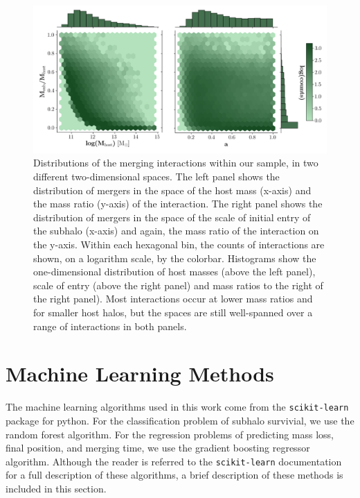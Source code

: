 \documentclass[fleqn,usenatbib]{mnras}
\begin{document}
\begin{figure}[h]
	\includegraphics[width=\textwidth]{Figures/combined_distributions_logbin}
    \caption{Distributions of the merging interactions within our sample, in two different two-dimensional spaces. The left panel shows the distribution of mergers in the space of the host mass (x-axis) and the mass ratio (y-axis) of the interaction. The right panel shows the distribution of mergers in the space of the scale of initial entry of the subhalo (x-axis) and again, the mass ratio of the interaction on the y-axis. Within each hexagonal bin, the counts of interactions are shown, on a logarithm scale, by the colorbar. Histograms show the one-dimensional distribution of host masses (above the left panel), scale of entry (above the right panel) and mass ratios to the right of the right panel). Most interactions occur at lower mass ratios and for smaller host halos, but the spaces are still well-spanned over a range of interactions in both panels. }
    \label{fig:combined_distributions_logBin}
\end{figure}



\section{Machine Learning Methods}
The machine learning algorithms used in this work come from the \texttt{scikit-learn} package for python. For the classification problem of subhalo survivial, we use the random forest algorithm. For the regression problems of predicting mass loss, final position, and merging time, we use the gradient boosting regressor algorithm. Although the reader is referred to the \texttt{scikit-learn} documentation for a full description of these algorithms, a brief description of these methods is included in this section.
\end{document}
